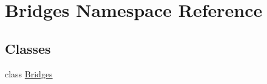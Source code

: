 \hypertarget{namespace_bridges}{}\section{Bridges Namespace Reference}
\label{namespace_bridges}
\subsection*{Classes}
\begin{DoxyCompactItemize}
\item 
class \hyperlink{class_bridges_1_1_bridges}{Bridges}
\end{DoxyCompactItemize}
